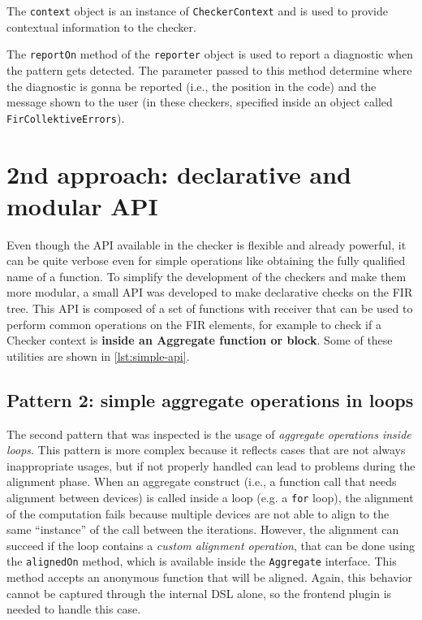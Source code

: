 \documentclass[12pt,a4paper,openright,twoside]{book}
\begin{document}


The \lstinline{context} object is an instance of \lstinline{CheckerContext} and is 
used to provide contextual information to the checker.

The \lstinline{reportOn} method of the \lstinline{reporter} object is used to
report a diagnostic when the pattern gets detected. The parameter passed to this
method determine where the diagnostic is gonna be reported (i.e., the position
in the code) and the message shown to the user (in these checkers, specified
inside an object called \lstinline{FirCollektiveErrors}).

\section{2nd approach: declarative and modular API}

Even though the API available in the checker is flexible and already powerful, 
it can be quite verbose even for simple operations like obtaining the fully
qualified name of a function. To simplify the development of the checkers and
make them more modular, a small API was developed to make declarative checks 
on the \ac{FIR} tree. This API is composed of a set of functions with receiver
that can be used to perform common operations on the \ac{FIR} elements, for 
example to check if a Checker context is \textbf{inside an Aggregate function 
or block}. Some of these utilities are shown in \cref{lst:simple-api}.




\subsection{Pattern 2: simple aggregate operations in loops}

The second pattern that was inspected is the usage of \emph{aggregate operations
inside loops}. This pattern is more complex because it reflects cases that are
not always inappropriate usages, but if not properly handled can lead to
problems during the alignment phase. 
%
When an aggregate construct (i.e., a function call that needs alignment between
devices) is called inside a loop (e.g. a \lstinline{for} loop), the alignment of
the computation fails because multiple devices are not able to align to the same
``instance'' of the call between the iterations. 
%
However, the alignment can succeed if the loop contains a \emph{custom alignment
operation}, that can be done using the \lstinline{alignedOn} method, which is
available inside the \lstinline{Aggregate} interface. This method accepts an
anonymous function that will be aligned. 
%
Again, this behavior cannot be captured through the internal DSL alone, so the
frontend plugin is needed to handle this case. 
\end{document}
